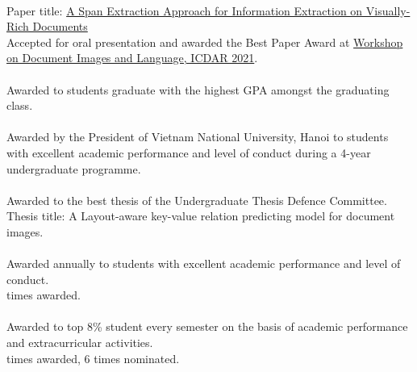 \\
Paper title: \href{https://aps.arxiv.org/abs/2106.00978}{A Span Extraction Approach for Information Extraction on Visually-Rich Documents}\\
\indent Accepted for oral presentation and awarded the Best Paper Award at \href{https://dil2021.github.io/index.html}{Workshop on Document Images and Language, ICDAR 2021}.\\

\\
Awarded to students graduate with the highest GPA amongst the graduating class.\\

\\
Awarded by the President of Vietnam National University, Hanoi to students with excellent academic performance and level of conduct during a 4-year undergraduate programme.\\

\\
Awarded to the best thesis of the Undergraduate Thesis Defence Committee.\\
\indent Thesis title: A Layout-aware key-value relation predicting model for document images.\\

\\
Awarded annually to students with excellent academic performance and level of conduct.\\
 times awarded.\\

\\
Awarded to top 8\% student every semester on the basis of academic performance and extracurricular activities.\\
 times awarded, 6 times nominated.\\

